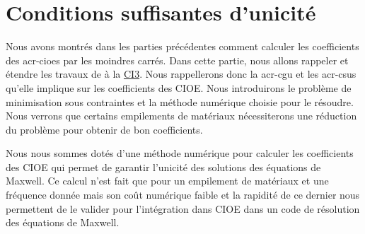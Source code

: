\chapter{Conditions suffisantes d'unicité}
\label{sec:chap:CSU}
\minitoc
\newpage
{}
Nous avons montrés dans les parties précédentes comment calculer les coefficients des \glspl{acr-cioe} par les moindres carrés. Dans cette partie, nous allons rappeler et étendre les travaux de \cite{stupfel_sufficient_2011} à la \hyperlink{ci3}{CI3}. Nous rappellerons donc la \gls{acr-cgu} et les \glspl{acr-csu} qu'elle implique sur les coefficients des CIOE. Nous introduirons le problème de minimisation sous contraintes et la méthode numérique choisie pour le résoudre. Nous verrons que certains empilements de matériaux nécessiterons une réduction du problème pour obtenir de bon coefficients.





Nous nous sommes dotés d'une méthode numérique pour calculer les coefficients des CIOE qui permet de garantir l'unicité des solutions des équations de Maxwell. Ce calcul n'est fait que pour un empilement de matériaux et une fréquence donnée mais son coût numérique faible et la rapidité de ce dernier nous permettent de le valider pour l'intégration dans CIOE dans un code de résolution des équations de Maxwell.